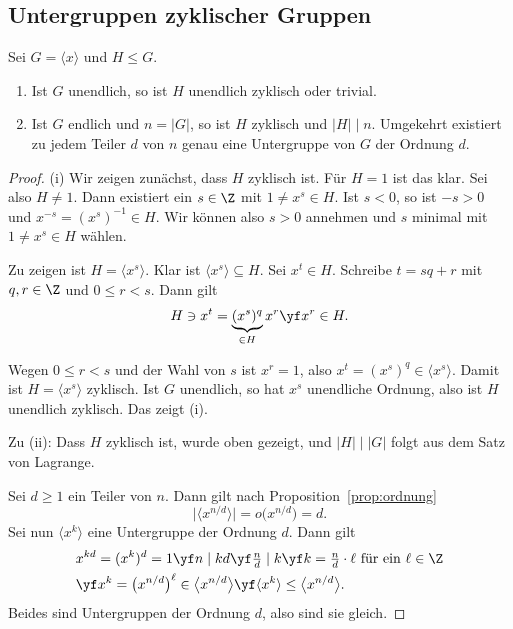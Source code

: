 \documentclass[11pt]{article}
\begin{document}
\subsection{Untergruppen zyklischer Gruppen}

\begin{theorem}\Theorem
  Sei $G = \langle x \rangle$ und $H \le G$.
  \begin{enumerate}[label=(\roman*)]
    \item Ist $G$ unendlich, so ist $H$ unendlich zyklisch oder trivial.
    \item Ist $G$ endlich und $n = \lvert G \rvert$, so ist $H$ zyklisch und $\lvert H \rvert \mid n$.
      Umgekehrt existiert zu jedem Teiler $d$ von $n$ genau eine Untergruppe von $G$ der Ordnung $d$.
  \end{enumerate}
\end{theorem}
\begin{proof}
  (i) Wir zeigen zunächst, dass $H$ zyklisch ist. Für $H = 1$ ist das klar. Sei also $H \neq 1$.
  Dann existiert ein $s \in \Z$ mit $1 \neq x^s \in H$.
  Ist $s < 0$, so ist $-s > 0$ und $x^{-s} = (x^s)^{-1} \in H$. Wir können also $s > 0$ annehmen und $s$ minimal mit $1 \neq x^s \in H$ wählen.

  Zu zeigen ist $H = \langle x^s \rangle$. Klar ist $\langle x^s \rangle \subseteq H$.
  Sei $x^t \in H$. Schreibe $t = sq + r$ mit $q, r \in \Z$ und $0 \le r < s$. Dann gilt
  \[ H \ni x^t = \underbrace{(x^s)^q}_{\in H} x^r \yf x^r \in H. \]


\begin{ergaenzung}
  Wegen $0 \le r < s$ und der Wahl von $s$ ist $x^r = 1$, also $x^t = (x^s)^q \in \langle x^s \rangle$. Damit ist $H = \langle x^s \rangle$ zyklisch. Ist $G$ unendlich, so hat $x^s$ unendliche Ordnung, also ist $H$ unendlich zyklisch. Das zeigt (i).
  \end{ergaenzung}

  Zu (ii): Dass $H$ zyklisch ist, wurde oben gezeigt, und $\lvert H \rvert \mid \lvert G \rvert$ folgt aus dem Satz von Lagrange.

  Sei $d \ge 1$ ein Teiler von $n$. Dann gilt nach Proposition~\ref{prop:ordnung}
  \[ \bigl\lvert \langle x^{n/d} \rangle \bigr\rvert = o\bigl(x^{n/d}\bigr) = d. \]
  Sei nun $\langle x^k \rangle$ eine Untergruppe der Ordnung $d$. Dann gilt
  \begin{align*}
    &x^{kd} = (x^k)^d = 1 \yf n \mid k d \yf \tfrac{n}{d} \mid k \yf k = \tfrac{n}{d} \cdot \ell \text{ für ein } \ell \in \Z \\
    &\yf x^k = \bigl(x^{n/d}\bigr)^{\ell} \in \bigl\langle x^{n/d} \bigr\rangle \yf \langle x^k \rangle \le \bigl\langle x^{n/d} \bigr\rangle.
  \end{align*}
Beides sind Untergruppen der Ordnung $d$, also sind sie gleich.
\end{proof}
\end{document}
